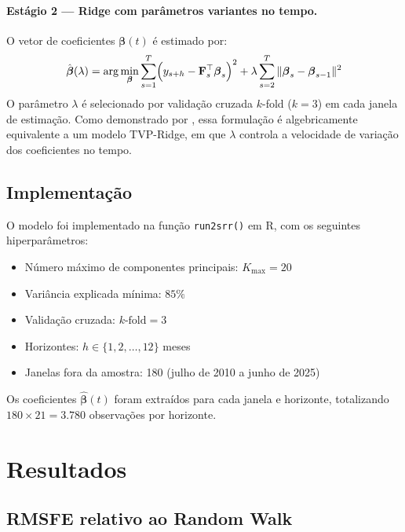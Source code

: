 \documentclass[12pt, a4paper]{article}
\begin{document}
\paragraph{Estágio 2 — Ridge com parâmetros variantes no tempo.}
O vetor de coeficientes $\boldsymbol{\beta}(t)$ é estimado por:
\[
  \hat{\boldsymbol{\beta}}(\lambda) =
  \arg\min_{\boldsymbol{\beta}}
  \sum_{s=1}^{T}
  \Bigl(y_{s+h} - \mathbf{F}_s^\top \boldsymbol{\beta}_s\Bigr)^2
  + \lambda \sum_{s=2}^{T}
  \|\boldsymbol{\beta}_s - \boldsymbol{\beta}_{s-1}\|^2
\]
O parâmetro $\lambda$ é selecionado por validação cruzada
$k$-fold ($k=3$) em cada janela de estimação. Como demonstrado
por \citet{Coulombe2021}, essa formulação é algebricamente
equivalente a um modelo TVP-Ridge, em que $\lambda$ controla a
velocidade de variação dos coeficientes no tempo.

\subsection{Implementação}

O modelo foi implementado na função \texttt{run2srr()} em R,
com os seguintes hiperparâmetros:

\begin{itemize}
  \item Número máximo de componentes principais: $K_{\max} = 20$
  \item Variância explicada mínima: $85\%$
  \item Validação cruzada: $k\text{-fold} = 3$
  \item Horizontes: $h \in \{1, 2, \ldots, 12\}$ meses
  \item Janelas fora da amostra: 180
    (julho de 2010 a junho de 2025)
\end{itemize}

Os coeficientes $\hat{\boldsymbol{\beta}}(t)$ foram extraídos
para cada janela e horizonte, totalizando
$180 \times 21 = 3.780$ observações por horizonte.

\section{Resultados}
\label{sec:resultados}

\subsection{RMSFE relativo ao Random Walk}
\end{document}
